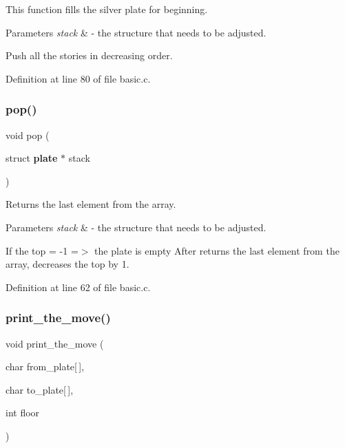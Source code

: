 This function fills the silver plate for beginning. 


\begin{DoxyParams}{Parameters}
{\em stack} & -\/ the structure that needs to be adjusted.\\
\hline
\end{DoxyParams}
Push all the stories in decreasing order. 

Definition at line 80 of file basic.\+c.

\mbox{\label{basic_8c_a9573c360dd0d59ddf1212f640b317741}} 
\subsubsection{pop()}
{\footnotesize\ttfamily void pop (\begin{DoxyParamCaption}\item[{struct \textbf{ plate} $\ast$}]{stack }\end{DoxyParamCaption})}



Returns the last element from the array. 


\begin{DoxyParams}{Parameters}
{\em stack} & -\/ the structure that needs to be adjusted.\\
\hline
\end{DoxyParams}
If the top = -\/1 =$>$ the plate is empty After returns the last element from the array, decreases the top by 1. 

Definition at line 62 of file basic.\+c.

\mbox{\label{basic_8c_aeb7199b4cba8c09d4febbf9ce250e4a4}} 
\subsubsection{print\+\_\+the\+\_\+move()}
{\footnotesize\ttfamily void print\+\_\+the\+\_\+move (\begin{DoxyParamCaption}\item[{char}]{from\+\_\+plate[$\,$],  }\item[{char}]{to\+\_\+plate[$\,$],  }\item[{int}]{floor }\end{DoxyParamCaption})}



